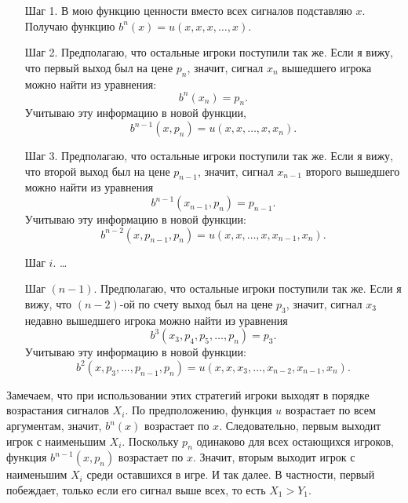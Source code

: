 \begin{itemize}
\begin{enumerate}
\item[Шаг 1.] В мою функцию ценности вместо всех сигналов подставляю $ x $. Получаю функцию $b^{n}(x)=u(x,x,x,\ldots,x)$.
\item[Шаг 2.] Предполагаю, что остальные игроки поступили так же. Если я вижу, что первый выход был на цене $ p_{n} $, значит, сигнал $x_{n}  $ вышедшего игрока можно найти из уравнения:
\begin{equation}
b^{n}(x_{n})=p_{n}.
\end{equation}
Учитываю эту информацию в новой функции,
\begin{equation}
b^{n-1}(x,p_{n})=u(x,x,\ldots,x,x_{n}).
\end{equation}
\item[Шаг 3.] Предполагаю, что остальные игроки поступили так же. Если я вижу, что второй выход был на цене $ p_{n-1} $, значит, сигнал $ x_{n-1} $ второго вышедшего можно найти из уравнения
\begin{equation}
b^{n-1}(x_{n-1},p_{n})=p_{n-1}.
\end{equation}
Учитываю эту информацию в новой функции:
\begin{equation}
b^{n-2}(x,p_{n-1},p_{n})=u(x,x,\ldots,x,x_{n-1},x_{n}).
\end{equation}
\item[Шаг $ i $.] \ldots

\item[Шаг $ (n-1) $.] Предполагаю, что остальные игроки поступили так же. Если я вижу, что $ (n-2) $-ой по счету выход был на цене $ p_{3} $, значит, сигнал $ x_{3} $ недавно вышедшего игрока можно найти из уравнения
\begin{equation}
b^{3}(x_{3},p_{4},p_{5},\ldots,p_{n})=p_{3}.
\end{equation}
Учитываю эту информацию в новой функции:
\begin{equation}
b^{2}(x,p_{3},\ldots,p_{n-1},p_{n})=u(x,x,x_{3},\ldots,x_{n-2},x_{n-1},x_{n}).
\end{equation}

\end{enumerate}

Замечаем, что при использовании этих стратегий игроки выходят в порядке возрастания сигналов $ X_{i} $. По предположению, функция $ u $ возрастает по всем аргументам, значит, $ b^{n}(x) $ возрастает по $ x $. Следовательно, первым выходит игрок с наименьшим $ X_{i} $. Поскольку $ p_{n} $ одинаково для всех остающихся игроков, функция $b^{n-1}(x,p_{n})$ возрастает по $x$. Значит, вторым выходит игрок с наименьшим $ X_{i} $ среди оставшихся в игре. И так далее. В частности, первый побеждает, только если его сигнал выше всех, то есть $ X_{1}>Y_{1} $.


\end{itemize}
